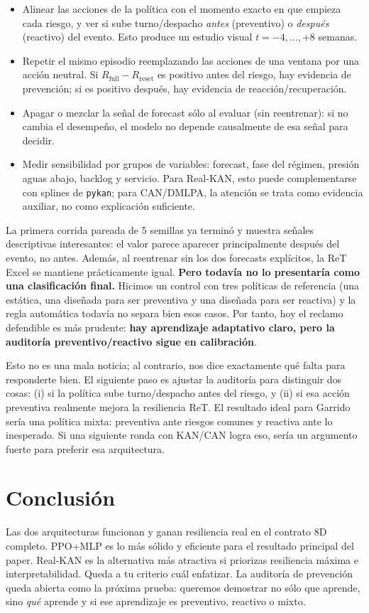 \documentclass[11pt]{article}
\begin{document}
\begin{itemize}
  \item Alinear las acciones de la política con el momento exacto en que empieza cada riesgo, y
        ver si sube turno/despacho \emph{antes} (preventivo) o \emph{después} (reactivo) del
        evento. Esto produce un estudio visual $t=-4,\ldots,+8$ semanas.
  \item Repetir el mismo episodio reemplazando las acciones de una ventana por una acción neutral.
        Si $R_{\mathrm{full}}-R_{\mathrm{reset}}$ es positivo antes del riesgo, hay evidencia de
        prevención; si es positivo después, hay evidencia de reacción/recuperación.
  \item Apagar o mezclar la señal de forecast sólo al evaluar (sin reentrenar): si no cambia el
        desempeño, el modelo no depende causalmente de esa señal para decidir.
  \item Medir sensibilidad por grupos de variables: forecast, fase del régimen, presión aguas
        abajo, backlog y servicio. Para Real-KAN, esto puede complementarse con splines de
        \texttt{pykan}; para CAN/DMLPA, la atención se trata como evidencia auxiliar, no como
        explicación suficiente.
\end{itemize}

La primera corrida pareada de 5 semillas ya terminó y muestra señales descriptivas interesantes:
el valor parece aparecer principalmente después del evento, no antes. Además, al reentrenar sin los
dos forecasts explícitos, la ReT Excel se mantiene prácticamente igual. \textbf{Pero todavía no lo
presentaría como una clasificación final.}
Hicimos un control con tres políticas de referencia (una estática, una diseñada para ser
preventiva y una diseñada para ser reactiva) y la regla automática todavía no separa bien esos
casos. Por tanto, hoy el reclamo defendible es más prudente:
\textbf{hay aprendizaje adaptativo claro, pero la auditoría preventivo/reactivo sigue en
calibración}.

Esto no es una mala noticia; al contrario, nos dice exactamente qué falta para responderte bien.
El siguiente paso es ajustar la auditoría para distinguir dos cosas: (i) si la política sube
turno/despacho antes del riesgo, y (ii) si esa acción preventiva realmente mejora la resiliencia
ReT. El resultado ideal para Garrido sería una política mixta: preventiva ante riesgos comunes y
reactiva ante lo inesperado. Si una siguiente ronda con KAN/CAN logra eso, sería un argumento
fuerte para preferir esa arquitectura.

\section*{Conclusión}

Las dos arquitecturas funcionan y ganan resiliencia real en el contrato 8D completo. PPO+MLP es lo más sólido y eficiente para
el resultado principal del paper. Real-KAN es la alternativa más atractiva si priorizas
resiliencia máxima e interpretabilidad. Queda a tu criterio cuál enfatizar. La auditoría de
prevención queda abierta como la próxima prueba: queremos demostrar no sólo que aprende, sino
\emph{qué} aprende y si ese aprendizaje es preventivo, reactivo o mixto.
\end{document}
